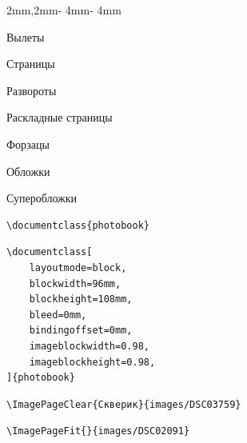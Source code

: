 \documentclass[
	layoutmode=block,
	blockwidth=96mm, blockheight=108mm,
	bleed=0mm,
	bindingoffset=0mm,
	imageblockwidth=0.98, imageblockheight=0.98,
	imageblockoffsettop=0mm,
	12pt,final,openany
]{photobook}
\newcommand\PageFushLeftC[1]{
	\begin{page}
		\begin{cell}{2mm,2mm}{\paperwidth - 4mm}{\paperheight - 4mm}
			\null
			\vfill
			\begin{flushleft}
				#1
			\end{flushleft}
			\vfill
			\null
		\end{cell}
	\end{page}}
\begin{document}
\PageFushLeftC{
		Вылеты

		Страницы

		Развороты

		Раскладные страницы

		Форзацы

		Обложки

		Суперобложки
}



\begin{page}
\vfill
\begin{center}
\begin{BVerbatim}
\documentclass{photobook}
\end{BVerbatim}
\end{center}
\vfill
\null
\end{page}

\begin{page}%
\begin{Verbatim}[tabsize=4]
\documentclass[
	layoutmode=block,
	blockwidth=96mm, 
	blockheight=108mm,
	bleed=0mm,
	bindingoffset=0mm,
	imageblockwidth=0.98, 
	imageblockheight=0.98,
]{photobook}
\end{Verbatim}
\end{page}



\begin{page}%
\vfill%
\begin{center}%
\scriptsize%
\begin{BVerbatim}
\ImagePageClear{Скверик}{images/DSC03759}
\end{BVerbatim}
\end{center}%
\vfill%
\null%
\end{page}




\begin{page}%
\vfill%
\begin{center}%
\scriptsize%
\begin{BVerbatim}
\ImagePageFit{}{images/DSC02091}
\end{BVerbatim}
\end{center}%
\vfill%
\null%
\end{page}

\end{document}
